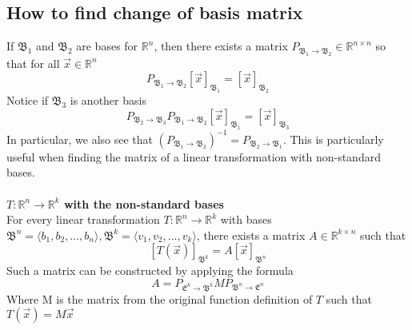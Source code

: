 \documentclass{report}
\begin{document}
\subsection{How to find change of basis matrix}
If $\mathfrak{B}_1$ and $\mathfrak{B}_2$ are bases for $\mathbb{R}^n$,  then there exists a matrix $P_{\mathfrak{B}_1\rightarrow\mathfrak{B}_2}\in\mathbb{R}^{n\times n}$ so that for all $\vec{x}\in\mathbb{R}^n$
$$
P_{\mathfrak{B}_1\rightarrow\mathfrak{B}_2}[\vec{x}]_{\mathfrak{B}_1} = [\vec{x}]_{\mathfrak{B}_2}
$$
Notice if $\mathfrak{B}_3$ is another basis
$$
P_{\mathfrak{B}_2\rightarrow\mathfrak{B}_3}P_{\mathfrak{B}_1\rightarrow\mathfrak{B}_2}[\vec{x}]_{\mathfrak{B}_1} = [\vec{x}]_{\mathfrak{B}_3}
$$
In particular,  we also see that $(P_{\mathfrak{B}_1\rightarrow\mathfrak{B}_2})^{-1} = P_{\mathfrak{B}_2\rightarrow\mathfrak{B}_1}$. This is particularly useful when finding the matrix of a linear transformation with non-standard bases. \\
\\
\textbf{$T:\mathbb{R}^n\rightarrow\mathbb{R}^k$ with the non-standard bases} \\
For every linear transformation $T:\mathbb{R}^n\rightarrow\mathbb{R}^k$ with bases $\mathfrak{B}^n = \langle b_1, b_2,\ldots,b_n \rangle,\mathfrak{B}^k=\langle v_1,v_2,\ldots,v_k \rangle$,  there exists a matrix $A\in\mathbb{R}^{k\times n}$ such that
$$
[T(\vec{x})]_{\mathfrak{B}^k} = A[\vec{x}]_{\mathfrak{B}^n}
$$
Such a matrix can be constructed by applying the formula
$$
A = P_{\mathfrak{E}^k\rightarrow\mathfrak{B}^k}MP_{\mathfrak{B}^n\rightarrow\mathfrak{E}^n}
$$
Where M is the matrix from the original function definition of $T$ such that $T(\vec{x}) = M\vec{x}$
\end{document}
